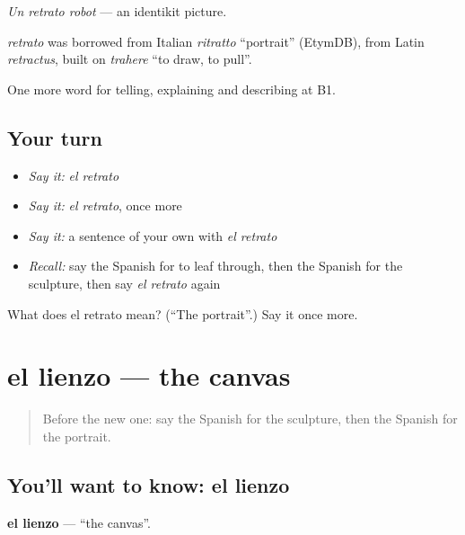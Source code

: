 \emph{Un retrato robot} — an identikit picture.

\begin{cousinweb}
\emph{retrato} was borrowed from Italian \emph{ritratto} \textquotedblleft{}portrait\textquotedblright{} (EtymDB), from Latin \emph{retractus}, built on \emph{trahere} \textquotedblleft{}to draw, to pull\textquotedblright{}.
\end{cousinweb}

\begin{grammarlens}[title={What you've built}]
One more word for telling, explaining and describing at B1.
\end{grammarlens}

\subsection*{Your turn}
\begin{itemize}
\raggedright
  \item \emph{Say it:} \emph{el retrato}
  \item \emph{Say it:} \emph{el retrato}, once more
  \item \emph{Say it:} a sentence of your own with \emph{el retrato}
  \item \emph{Recall:} say the Spanish for to leaf through, then the Spanish for the sculpture, then say \emph{el retrato} again
\end{itemize}

\begin{tcolorbox}[breakable,colback=teal!4,colframe=teal!35!black,title={Before you move on}]
What does el retrato mean? (\textquotedblleft{}The portrait\textquotedblright{}.) Say it once more.
\end{tcolorbox}
\section[el lienzo]{el lienzo — the canvas}

\label{lesson:ES-C763-lienzo}



\begin{quote}
Before the new one: say the Spanish for the sculpture, then the Spanish for the portrait.
\end{quote}

\subsection*{You'll want to know: el lienzo}
\textbf{el lienzo} — \textquotedblleft{}the canvas\textquotedblright{}.

